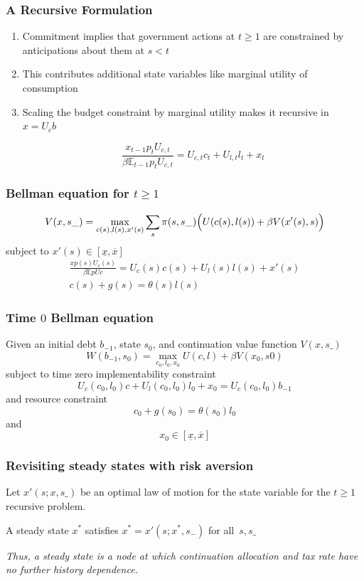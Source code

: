 \documentclass{beamer}
\newcommand{\EE}{\mathbb E}
\begin{document}
 \begin{frame}
	\frametitle{A Recursive Formulation}
	
	\begin{enumerate}
	 \item Commitment implies that government actions at $t \geq 1$ are constrained by  anticipations about them at $s < t$
	 \item This contributes additional state variables like marginal utility of consumption
	 \item Scaling the budget constraint by marginal utility makes it recursive in  $x=U_c b$
	
	\[
		\frac{x_{t-1} p_t U_{c,t}}{\beta \EE_{t-1} p_t U_{c,t}}  = U_{c,t}c_t+U_{l,t} l_t + x_t
	\]
	
	\end{enumerate}
	
	
	\end{frame}
	\begin{frame}
	\frametitle{Bellman equation for $t\geq1$}
	\[
		V(x,s\_) = \max_{c(s),l(s),x'(s)} \sum_s \pi(s,s\_)\Bigl(U(c(s),l(s)) + \beta V(x'(s),s)\Bigr)
	\]subject to $x'(s)\in [\underline x,\overline x]$
	\begin{align*}
		\frac{x p(s) U_c(s)}{\beta\EE pUc} =U_c(s)c(s)+U_l(s)l(s) + x'(s)\\
		c(s) + g(s) = \theta(s)l(s)
	\end{align*}
	
 \end{frame}
\begin{frame}
	\frametitle{Time $0$ Bellman equation}
	Given an initial  debt $b_{-1}$, state $s_0$,  and continuation value function $V(x,s\_)$
	\[
		W(b_{-1},s_0) = \max_{c_{0},l_0,x_{0}} U(c,l) +\beta V(x_0,s0)
	\]subject to  time zero implementability constraint
	\[
		U_{c}(c_0,l_0)c + U_l(c_0,l_0) l_0 + x_0 = U_c(c_0,l_0) b_{-1}
	\]and  resource constraint
	\[
		c_0+ g(s_0) = \theta(s_0) l_0
	\]and
	\[
		x_0 \in [\underline x,\overline x]
	\]
\end{frame}



\begin{frame}
 \frametitle{Revisiting steady states with risk aversion}
Let $x'\left( s;{x},s\_\right) $ be an optimal  law of motion for the state variable
for the $t\geq1$ recursive problem.

\begin{definition}
 A steady state  ${x}^{*} $  satisfies ${ x}^{*}  =x' \left( s;{x}^{*},s_{-}\right) $ for all $%
\,s,s\_$
\end{definition}


\vspace{3mm}
\emph{Thus, a steady state is a node at which  continuation allocation and tax rate have no further history dependence. }

 \end{frame}
\end{document}
